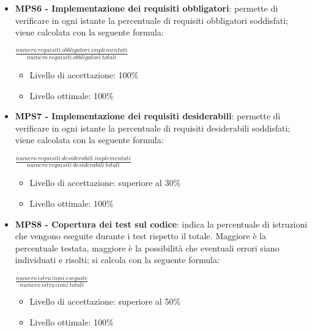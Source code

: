 \documentclass[11pt,a4paper]{article}
\begin{document}
{\begin{itemize}
    	\begin{itemize}
    	    \item \textbf{N}: rappresenta il numero di nodi;
    	    \item E: rappresenta il numero di archi;
    	    \item P: rappresenta il numero di componenti connesse.
    	\end{itemize}
    	  \begin{itemize}
	 \item Livello di accettazione: minore di 10
	 \item Livello ottimale: minore di 8
	 \end{itemize}
		\item \textbf{MPS6 - Implementazione dei requisiti obbligatori}: permette di verificare in ogni istante la percentuale di requisiti obbligatori soddisfati; viene calcolata con la seguente formula: 
		\begin{center}
		$\frac{numero\ requisiti\ obbligatori\ implementati}{numero\ requisiti\ obbligatori\ totali}$
	\end{center}
	\begin{itemize}
	 \item Livello di accettazione: 100\%
	 \item Livello ottimale: 100\%
	 \end{itemize}
		\item \textbf{MPS7 - Implementazione dei requisiti desiderabili}: permette di verificare in ogni istante la percentuale di requisiti desiderabili soddisfati; viene calcolata con la seguente formula: 
		\begin{center}
		$\frac{numero\ requisiti\ desiderabili\ implementati}{numero\ requisiti\ desiderabili\ totali}$
	\end{center}
	\begin{itemize}
	 \item Livello di accettazione: superiore al 30\%
	 \item Livello ottimale: 100\%
	 \end{itemize}
		\item \textbf{MPS8 - Copertura dei test sul codice}: indica la percentuale di istruzioni che vengono eseguite durante i test rispetto il totale. Maggiore è la percentuale testata, maggiore è la possibilità che eventuali errori siano individuati e risolti; si calcola con la seguente formula:
		\begin{center}
		$\frac{numero\ istruzioni\ eseguite}{numero\ istruzioni\ totali}$	
		\end{center}
	\begin{itemize}
	 \item Livello di accettazione: superiore al 50\%
	 \item Livello ottimale: 100\%
	 \end{itemize}
	 

\end{itemize}}
\end{document}
